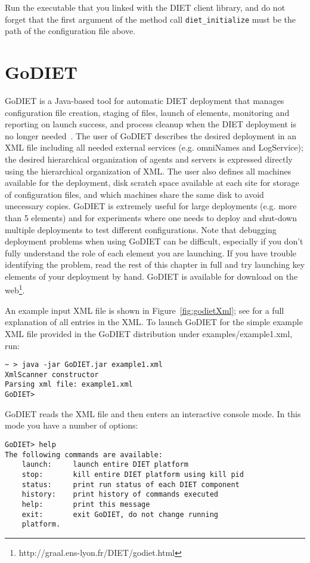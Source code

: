 Run the executable that you linked with the DIET client library, and
do not forget that the first argument of the method call
\texttt{diet\_initialize} must be the path of the configuration
file above.

\section{GoDIET}
\label{sec:deployGoDIET}

GoDIET is a Java-based tool for automatic DIET deployment that
manages configuration file creation, staging of files, launch of
elements, monitoring and reporting on launch success, and process
cleanup when the DIET deployment is no longer needed~\cite{CDa05}.
The user of GoDIET describes the desired deployment in an XML file
including all needed external services (e.g. omniNames and
LogService); the desired hierarchical organization of agents and
servers is expressed directly using the hierarchical organization of
XML.  The user also defines all machines available for the
deployment, disk scratch space available at each site for storage of
configuration files, and which machines share the same disk to avoid
unecessary copies. GoDIET is extremely useful for large deployments
(e.g. more than 5 elements) and for experiments where one needs to
deploy and shut-down multiple deployments to test different
configurations. Note that debugging deployment problems when using
GoDIET can be difficult, especially if you don't fully understand
the role of each element you are launching.  If you have trouble
identifying the problem, read the rest of this chapter in full and
try launching key elements of your deployment by hand.  GoDIET is
available for download on the
web\footnote{http://graal.ens-lyon.fr/DIET/godiet.html}.

An example input XML file is shown in Figure~\ref{fig:godietXml};
see \cite{CDa05} for a full explanation of all entries in the XML.
To launch GoDIET for the simple example XML file provided in the
GoDIET distribution under examples/example1.xml, run:

\begin{verbatim}
~ > java -jar GoDIET.jar example1.xml
XmlScanner constructor
Parsing xml file: example1.xml
GoDIET>
\end{verbatim}

GoDIET reads the XML file and then enters an interactive console mode.
In this mode you have a number of options:

\begin{verbatim}
GoDIET> help
The following commands are available:
    launch:     launch entire DIET platform
    stop:       kill entire DIET platform using kill pid
    status:     print run status of each DIET component
    history:    print history of commands executed
    help:       print this message
    exit:       exit GoDIET, do not change running
    platform.
\end{verbatim}

